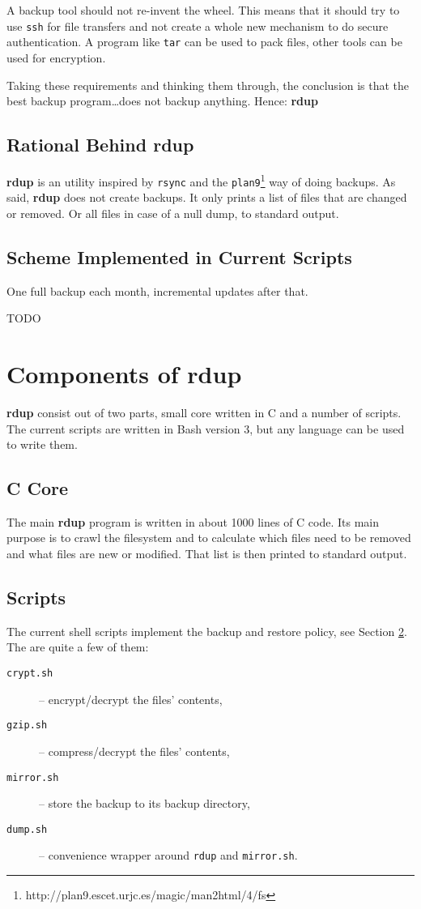 \documentclass[a4paper, openany]{memoir}
\newcommand{\rdup}{\textbf{rdup}}
\newcommand{\cmd}[1]{\texttt{#1}}
\begin{document}
A backup tool should not re-invent the wheel.  This means that it should
try to use \cmd{ssh} for file transfers and not create a whole new
mechanism to do secure authentication. A program like \cmd{tar} can be
used to pack files, other tools can be used for encryption. 

Taking these requirements and thinking them through, the
conclusion is that the best backup program\ldots does not backup anything.
Hence: \rdup

\section{Rational Behind \rdup}
\rdup{} is an utility inspired by \cmd{rsync} and the 
\cmd{plan9}\footnote{http://plan9.escet.urjc.es/magic/man2html/4/fs} 
way of doing backups. As said, \rdup{} does not create backups. It only
prints a list of files that are changed or removed. Or all files in case
of a null dump, to standard output. 

\section{Scheme Implemented in Current Scripts}
\label{sec:scheme implemented in current scripts}
One full backup each month, incremental updates after that.

TODO


\chapter{Components of \rdup}

\rdup{} consist out of two parts, small core written in C and
a number of scripts. The current scripts are written in 
Bash version 3, but any language can be used to write them.

\section{C Core}
The main \rdup{} program is written in about 1000 lines of C code. Its
main purpose is to crawl the filesystem and to calculate which files
need to be removed and what files are new or modified. That list is then
printed to standard output.

\section{Scripts}
The current shell scripts implement the backup and restore policy, see
Section \ref{sec:scheme implemented in current scripts}.
The are quite a few of them:
\begin{description}
\item[\cmd{crypt.sh}]{-- encrypt/decrypt the files' contents,}
\item[\cmd{gzip.sh}]{-- compress/decrypt the files' contents,}
\item[\cmd{mirror.sh}]{-- store the backup to its backup directory,}
\item[\cmd{dump.sh}]{-- convenience wrapper around \cmd{rdup} and \cmd{mirror.sh}.}
\end{description}
\end{document}
